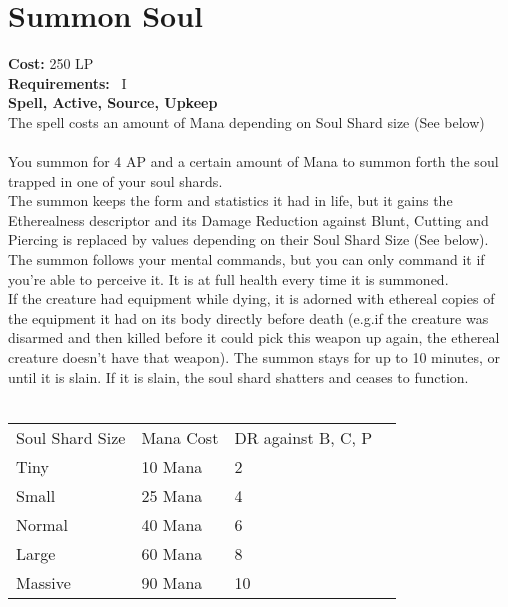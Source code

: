\section{Summon Soul}\label{spell:summonSoul}
\textbf{Cost:} 250 LP\\
\textbf{Requirements:}~ I\\
\textbf{Spell, Active, Source, Upkeep}\\
The spell costs an amount of Mana depending on Soul Shard size (See below)\\
\\
You summon for 4 AP and a certain amount of Mana to summon forth the soul trapped in one of your soul shards.\\
The summon keeps the form and statistics it had in life, but it gains the Etherealness descriptor and its Damage Reduction against Blunt, Cutting and Piercing is replaced by values depending on their Soul Shard Size (See below).
The summon follows your mental commands, but you can only command it if you're able to perceive it.
It is at full health every time it is summoned.\\
If the creature had equipment while dying, it is adorned with ethereal copies of the equipment it had on its body directly before death (e.g.if the creature was disarmed and then killed before it could pick this weapon up again, the ethereal creature doesn't have that weapon).
The summon stays for up to 10 minutes, or until it is slain.
If it is slain, the soul shard shatters and ceases to function.\\
\\
\begin{longtable}{l | l | p{5.5cm} | p{2.5cm}}
    Soul Shard Size & Mana Cost & DR against B, C, P\\
    Tiny & 10 Mana & 2\\
    Small & 25 Mana & 4\\
    Normal & 40 Mana & 6\\
    Large & 60 Mana & 8\\
    Massive & 90 Mana & 10\\
\end{longtable}


